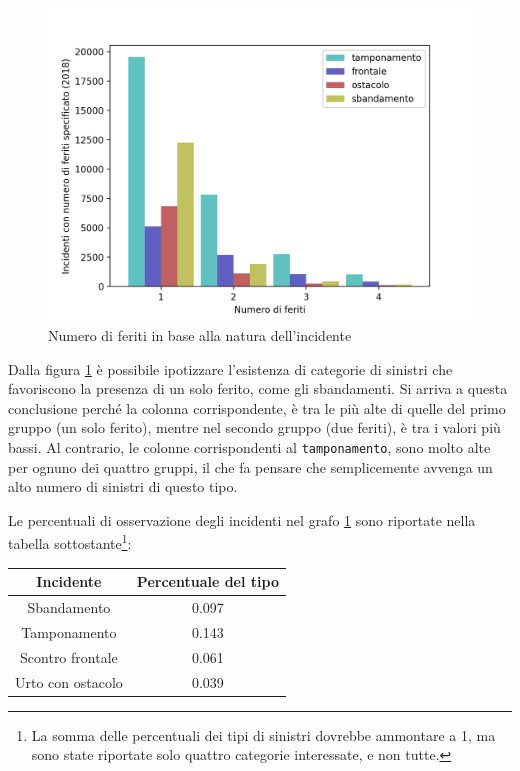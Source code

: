 \documentclass[a4paper,12pt]{report}
\newcommand{\columnstyle}[1]{\texttt{#1}}
\begin{document}
\begin{figure}
    \includegraphics[width=\linewidth]{../src/incidenti/incidenti_senza_coords/natura_incidente/natura_incidente.png}
    \caption{Numero di feriti in base alla natura dell'incidente}
    \label{fig:numero-feriti}
\end{figure}

Dalla figura \ref{fig:numero-feriti} è possibile ipotizzare l'esistenza di categorie 
di sinistri che favoriscono la presenza di un solo ferito, come gli sbandamenti. 
Si arriva a questa conclusione perché la colonna corrispondente, è tra 
le più alte di quelle del primo gruppo (un solo ferito), 
mentre nel secondo gruppo (due feriti), è tra i valori più bassi.
Al contrario, le colonne corrispondenti al \columnstyle{tamponamento}, sono molto alte 
per ognuno dei quattro gruppi, il che fa pensare che semplicemente avvenga un alto numero 
di sinistri di questo tipo.

Le percentuali di osservazione degli incidenti nel grafo \ref{fig:numero-feriti} sono 
riportate nella tabella sottostante\footnote{La somma delle percentuali dei tipi di 
sinistri dovrebbe ammontare a 1, ma sono state riportate solo quattro categorie 
interessate, e non tutte.}: 

\begin{center}
    \def\arraystretch{1.5}%
    \begin{tabular}{ |c|c| } 
    \hline
    Incidente & Percentuale del tipo \\ 
    \hline
    \rowcolor{TableGray}
    Sbandamento       & 0.097 \\
    Tamponamento      & 0.143 \\
    \rowcolor{TableGray}
    Scontro frontale  & 0.061 \\
    Urto con ostacolo & 0.039 \\
    \hline
    \end{tabular}
\end{center}
\end{document}
